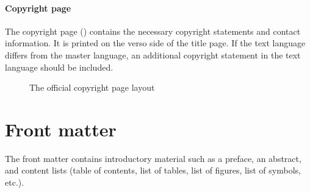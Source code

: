 \documentclass[11pt,article,oneside,a4paper]{memoir}
\begin{document}
\paragraph{Copyright page} The copyright page ()
contains the necessary copyright statements and contact information. It is
printed on the verso side of the title page. If the text language differs
from the master language, an additional copyright statement in the text
language should be included.
\begin{figure}
  \centering \fboxsep=0pt
  \caption{The official copyright page layout}
  \label{fig:copyright}
\end{figure}

\section{Front matter}
The front matter contains introductory material such as a preface, an
abstract, and content lists (table of contents, list of tables, list of
figures, list of symbols, etc.).
\end{document}
